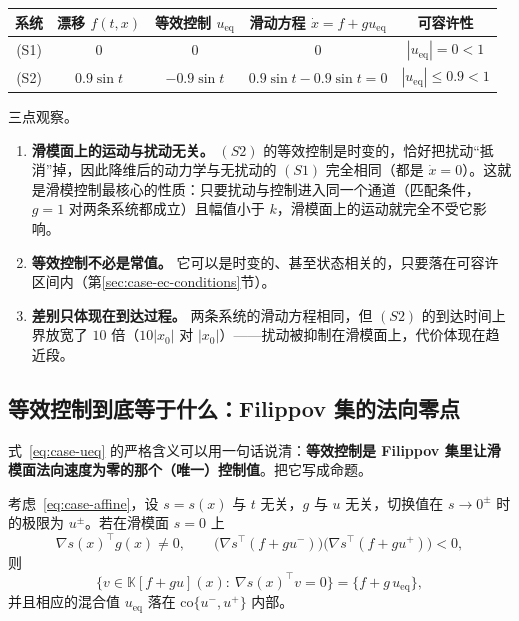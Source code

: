 \begin{center}
\small
\begin{tabular}{@{}c|c|c|c|c@{}}
  \hline
  系统 & 漂移 $f(t,x)$ & 等效控制 $u_\mathrm{eq}$ & 滑动方程 $\dot x=f+gu_\mathrm{eq}$ & 可容许性 \\
  \hline
  (S1) & $0$ & $0$ & $0$ & $|u_\mathrm{eq}|=0<1$ \\
  \hline
  (S2) & $0.9\sin t$ & $-0.9\sin t$ & $0.9\sin t-0.9\sin t=0$ & $|u_\mathrm{eq}|\le0.9<1$ \\
  \hline
\end{tabular}
\end{center}

三点观察。

\begin{enumerate}
  \item \textbf{滑模面上的运动与扰动无关。} $(S2)$ 的等效控制是时变的，恰好把扰动“抵消”掉，因此降维后的动力学与无扰动的 $(S1)$ 完全相同（都是 $\dot x=0$）。这就是滑模控制最核心的性质：只要扰动与控制进入同一个通道（匹配条件，$g=1$ 对两条系统都成立）且幅值小于 $k$，滑模面上的运动就完全不受它影响。
  \item \textbf{等效控制不必是常值。} 它可以是时变的、甚至状态相关的，只要落在可容许区间内（第\ref{sec:case-ec-conditions}节）。
  \item \textbf{差别只体现在到达过程。} 两条系统的滑动方程相同，但 $(S2)$ 的到达时间上界放宽了 $10$ 倍（$10|x_0|$ 对 $|x_0|$）——扰动被抑制在滑模面上，代价体现在趋近段。
\end{enumerate}

\subsection{等效控制到底等于什么：Filippov 集的法向零点}\label{sec:case-ec-meaning}

式~\eqref{eq:case-ueq} 的严格含义可以用一句话说清：\textbf{等效控制是 Filippov 集里让滑模面法向速度为零的那个（唯一）控制值}。把它写成命题。

\begin{proposition}[等效控制 = 唯一的法向零点]\label{prop:case-ueq}
  考虑~\eqref{eq:case-affine}，设 $s=s(x)$ 与 $t$ 无关，$g$ 与 $u$ 无关，切换值在 $s\to0^\pm$ 时的极限为 $u^\pm$。若在滑模面 $s=0$ 上
  \[
  \nabla s(x)^\top g(x)\neq0,
  \qquad
  \big(\nabla s^\top(f+gu^-)\big)\big(\nabla s^\top(f+gu^+)\big)<0 ,
  \]
  则
  \[
  \big\{v\in\mathbb{K}[f+gu](x):\ \nabla s(x)^\top v=0\big\}=\big\{f+g\,u_\mathrm{eq}\big\},
  \]
  并且相应的混合值 $u_\mathrm{eq}$ 落在 $\mathrm{co}\{u^-,u^+\}$ 内部。
\end{proposition}

